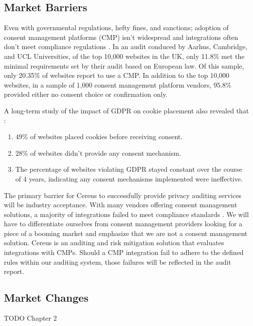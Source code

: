 \subsection{Market Barriers}

Even with governmental regulations, hefty fines, and sanctions; adoption of consent management platforms (CMP) isn't widespread and integrations often don't meet compliance regulations \cite{nouwens.2020}. In an audit conduced by Aarhus, Cambridge, and UCL Universities, of the top 10,000 websites in the UK, only 11.8\% met the minimal requirements set by their audit based on European law. Of this sample, only 20.35\% of websites report to use a CMP. In addition to the top 10,000 websites, in a sample of 1,000 consent management platform vendors, 95.8\% provided either no consent choice or confirmation only.

A long-term study of the impact of GDPR on cookie placement also revealed that \cite{trevisan.2019}:

\begin{enumerate}
  \item 49\% of websites placed cookies before receiving consent.
  \item 28\% of websites didn't provide any consent mechanism.
  \item The percentage of websites violating GDPR stayed constant over the course of 4 years, indicating any consent mechanisms implemented were ineffective.
\end{enumerate}


\noindent
The primary barrier for Cereus to successfully provide privacy auditing services will be industry acceptance. With many vendors offering consent management solutions, a majority of integrations failed to meet compliance standards \cite{nouwens.2020}. We will have to differentiate ourselves from consent management providers looking for a piece of a booming market and emphasize that we are not a consent management solution. Cereus is an auditing and risk mitigation solution that evaluates integrations with CMPs. Should a CMP integration fail to adhere to the defined rules within our auditing system, those failures will be reflected in the audit report.

\subsection{Market Changes}

TODO Chapter 2

